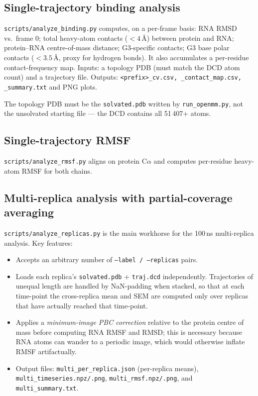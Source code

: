 \documentclass[11pt,a4paper]{article}
\begin{document}
\subsection{Single-trajectory binding analysis}
\texttt{scripts/analyze\_binding.py} computes, on a per-frame basis:
RNA RMSD vs.\ frame 0; total heavy-atom contacts ($<4\,\si{\angstrom}$)
between protein and RNA; protein--RNA centre-of-mass distance;
G3-specific contacts; G3 base polar contacts ($<3.5\,\si{\angstrom}$,
proxy for hydrogen bonds). It also accumulates a per-residue
contact-frequency map. Inputs: a topology PDB (must match the DCD atom
count) and a trajectory file. Outputs: \texttt{<prefix>\_cv.csv,
\_contact\_map.csv, \_summary.txt} and PNG plots.

The topology PDB must be the \texttt{solvated.pdb} written by
\texttt{run\_openmm.py}, not the unsolvated starting file --- the DCD
contains all 51\,407+ atoms.

\subsection{Single-trajectory RMSF}
\texttt{scripts/analyze\_rmsf.py} aligns on protein C$\alpha$ and
computes per-residue heavy-atom RMSF for both chains.

\subsection{Multi-replica analysis with partial-coverage averaging}
\label{sec:anal:multi}
\texttt{scripts/analyze\_replicas.py} is the main workhorse for the
100\,ns multi-replica analysis. Key features:

\begin{itemize}[leftmargin=*]
\item Accepts an arbitrary number of \texttt{--label / --replicas}
pairs.
\item Loads each replica's \texttt{solvated.pdb} + \texttt{traj.dcd}
independently. Trajectories of unequal length are handled by NaN-padding
when stacked, so that at each time-point the cross-replica mean and SEM
are computed only over replicas that have actually reached that
time-point.
\item Applies a \emph{minimum-image PBC correction} relative to the
protein centre of mass before computing RNA RMSF and RMSD; this is
necessary because RNA atoms can wander to a periodic image, which would
otherwise inflate RMSF artifactually.
\item Output files: \texttt{multi\_per\_replica.json} (per-replica means),
\texttt{multi\_timeseries.npz/.png}, \texttt{multi\_rmsf.npz/.png}, and
\texttt{multi\_summary.txt}.
\end{itemize}
\end{document}

